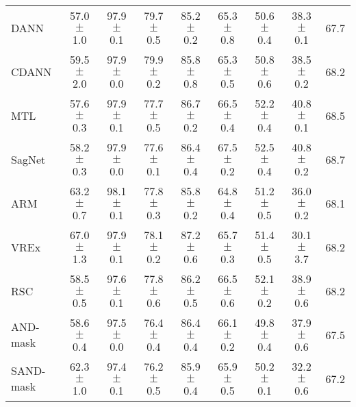 \documentclass{article}
\begin{document}
\begin{center}
{\begin{tabular}{lcccccccc}
DANN                      & 57.0 $\pm$ 1.0            & 97.9 $\pm$ 0.1            & 79.7 $\pm$ 0.5            & 85.2 $\pm$ 0.2            & 65.3 $\pm$ 0.8            & 50.6 $\pm$ 0.4            & 38.3 $\pm$ 0.1            & 67.7                      \\
CDANN                     & 59.5 $\pm$ 2.0            & 97.9 $\pm$ 0.0            & 79.9 $\pm$ 0.2            & 85.8 $\pm$ 0.8            & 65.3 $\pm$ 0.5            & 50.8 $\pm$ 0.6            & 38.5 $\pm$ 0.2            & 68.2                      \\
MTL                       & 57.6 $\pm$ 0.3            & 97.9 $\pm$ 0.1            & 77.7 $\pm$ 0.5            & 86.7 $\pm$ 0.2            & 66.5 $\pm$ 0.4            & 52.2 $\pm$ 0.4            & 40.8 $\pm$ 0.1            & 68.5                      \\
SagNet                    & 58.2 $\pm$ 0.3            & 97.9 $\pm$ 0.0            & 77.6 $\pm$ 0.1            & 86.4 $\pm$ 0.4            & 67.5 $\pm$ 0.2            & 52.5 $\pm$ 0.4            & 40.8 $\pm$ 0.2            & 68.7                      \\
ARM                       & 63.2 $\pm$ 0.7            & 98.1 $\pm$ 0.1            & 77.8 $\pm$ 0.3            & 85.8 $\pm$ 0.2            & 64.8 $\pm$ 0.4            & 51.2 $\pm$ 0.5            & 36.0 $\pm$ 0.2            & 68.1                      \\
VREx                      & 67.0 $\pm$ 1.3            & 97.9 $\pm$ 0.1            & 78.1 $\pm$ 0.2            & 87.2 $\pm$ 0.6            & 65.7 $\pm$ 0.3            & 51.4 $\pm$ 0.5            & 30.1 $\pm$ 3.7            & 68.2                      \\
RSC                       & 58.5 $\pm$ 0.5            & 97.6 $\pm$ 0.1            & 77.8 $\pm$ 0.6            & 86.2 $\pm$ 0.5            & 66.5 $\pm$ 0.6            & 52.1 $\pm$ 0.2            & 38.9 $\pm$ 0.6            & 68.2                      \\
AND-mask                  & 58.6 $\pm$ 0.4            & 97.5 $\pm$ 0.0            & 76.4 $\pm$ 0.4            & 86.4 $\pm$ 0.4            & 66.1 $\pm$ 0.2            & 49.8 $\pm$ 0.4            & 37.9 $\pm$ 0.6            & 67.5                      \\
SAND-mask                 & 62.3 $\pm$ 1.0            & 97.4 $\pm$ 0.1            & 76.2 $\pm$ 0.5            & 85.9 $\pm$ 0.4            & 65.9 $\pm$ 0.5            & 50.2 $\pm$ 0.1            & 32.2 $\pm$ 0.6            & 67.2                      \\

\end{tabular}}
\end{center}
\end{document}
